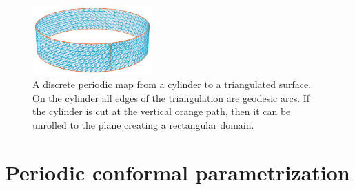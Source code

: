 \documentclass[article.tex]{subfiles}
\begin{document}
\begin{figure}[tb]
\centering
\includegraphics[width=0.41\textwidth]{images/discrete_map_cylinder.png}
\caption{A discrete periodic map from a cylinder to a triangulated surface.  On the
cylinder all edges of the triangulation are geodesic arcs. If the cylinder is cut at the
vertical orange path, then it can be unrolled to the plane creating a rectangular 
domain.}
\label{fig:discrete_map}
\end{figure}

\section{Periodic conformal parametrization}
\label{sec:conformal-parameterization}
\end{document}
